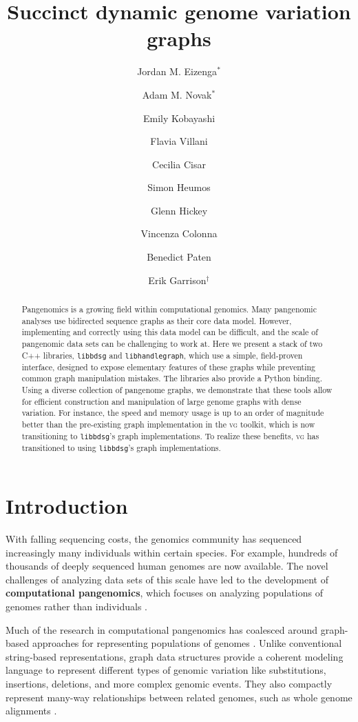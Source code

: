 \documentclass{article}
\title{Succinct dynamic genome variation graphs} %
\author{Jordan M. Eizenga$^*$
  \and Adam M. Novak$^*$
  \and Emily Kobayashi
  \and Flavia Villani
  \and Cecilia Cisar
  \and Simon Heumos
  \and Glenn Hickey
  \and Vincenza Colonna
  \and Benedict Paten
  \and Erik Garrison$^\dagger$}
\newcommand{\vocab}{\textbf}
\begin{document}
\maketitle

\begin{abstract}

Pangenomics is a growing field within computational genomics.
Many pangenomic analyses use bidirected sequence graphs as their core data model.
However, implementing and correctly using this data model can be difficult, and the scale of pangenomic data sets can be challenging to work at.
Here we present a stack of two C++ libraries, \texttt{libbdsg} and \texttt{libhandlegraph}, which use a simple, field-proven interface, designed to expose elementary features of these graphs while preventing common graph manipulation mistakes.
The libraries also provide a Python binding.
Using a diverse collection of pangenome graphs, we demonstrate that these tools allow for efficient construction and manipulation of large genome graphs with dense variation.
For instance, the speed and memory usage is up to an order of magnitude better than the pre-existing graph implementation in the \textsc{vg} toolkit, which is now transitioning to \texttt{libbdsg}'s graph implementations.
To realize these benefits, \textsc{vg} has transitioned to using \texttt{libbdsg}'s graph implementations.

\end{abstract}

\section{Introduction}


With falling sequencing costs, the genomics community has sequenced increasingly many individuals within certain species.
For example, hundreds of thousands of deeply sequenced human genomes are now available.
The novel challenges of analyzing data sets of this scale have led to the development of \vocab{computational pangenomics}, which focuses on analyzing populations of genomes rather than individuals \cite{computational2016computational}.

Much of the research in computational pangenomics has coalesced around graph-based approaches for representing populations of genomes \cite{Paten_2017}.
Unlike conventional string-based representations, graph data structures provide a coherent modeling language to represent different types of genomic variation like substitutions, insertions, deletions, and more complex genomic events.
They also compactly represent many-way relationships between related genomes, such as whole genome alignments \cite{kehr2014genome}.
\end{document}

